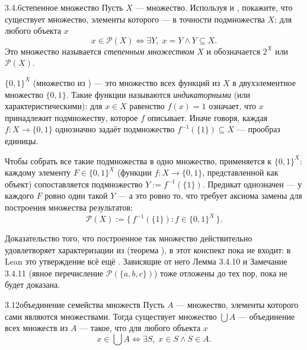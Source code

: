 \begin{exercise}{3.4.6}{степенное множество}
Пусть $X$ — множество. Используя  и , покажите, что существует множество, элементы которого — в точности
подмножества $X$: для любого объекта $x$
\[
  x\in\mathcal{P}(X) \iff \exists Y,\; x=Y \land Y\subseteq X.
\]
Это множество называется \emph{степенным множеством} $X$ и обозначается $2^X$ или
$\mathcal{P}(X)$.
\end{exercise}

\begin{intuition}
$\{0,1\}^X$ (множество из ) — это множество всех функций из $X$
в двухэлементное множество $\{0,1\}$. Такие функции называются \emph{индикаторными} (или
характеристическими): для $x\in X$ равенство $f(x)=1$ означает, что $x$ принадлежит
подмножеству, которое $f$ описывает. Иначе говоря, каждая $f:X\to\{0,1\}$ однозначно задаёт
подмножество $f^{-1}(\{1\})\subseteq X$ — прообраз единицы.

Чтобы собрать все такие подмножества в одно множество, 
применяется к $\{0,1\}^X$: каждому элементу $F\in\{0,1\}^X$ (функции $f:X\to\{0,1\}$,
представленной как объект) сопоставляется подмножество $Y:=f^{-1}(\{1\})$. Предикат
однозначен — у каждого $F$ ровно один такой $Y$ — а это ровно то, что требует аксиома замены
для построения множества результатов:
\[
  \mathcal{P}(X) := \{\,f^{-1}(\{1\}) : f\in\{0,1\}^X\,\}.
\]
\end{intuition}

\begin{remark}
Доказательство того, что построенное так множество  действительно
удовлетворяет характеризации из  (теорема ), в этот
конспект пока не входит: в Lean это утверждение всё ещё . Зависящие от него
Лемма 3.4.10 и Замечание 3.4.11 (явное перечисление $\mathcal{P}(\{a,b,c\})$) тоже отложены
до тех пор, пока  не будет доказана.
\end{remark}

\begin{axiom}{3.12}{объединение семейства множеств}
Пусть $A$ — множество, элементы которого сами являются множествами. Тогда существует
множество $\bigcup A$ — объединение всех множеств из $A$ — такое, что для любого объекта $x$
\[
  x\in\bigcup A \iff \exists S,\; x\in S \land S\in A.
\]
\end{axiom}

